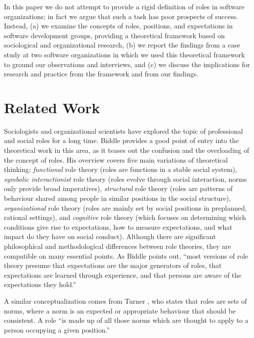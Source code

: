\documentclass[10pt, conference, compsocconf]{IEEEtran}
\begin{document}
In this paper we do not attempt to provide a rigid definition of roles in software organizations; in fact we argue that such a task has poor prospects of success. Instead, (a) we examine the concepts of roles, positions, and expectations in software development groups, providing a theoretical framework based on sociological and organizational research, (b) we report the findings from a case study at two software organizations in which we used this theoretical framework to ground our observations and interviews, and (c) we discuss the implications for research and practice from the framework and from our findings.




\section{Related Work}

Sociologists and organizational scientists have explored the topic of professional and social roles for a long time. Biddle \cite{Biddle1986} provides a good point of entry into the theoretical work in this area, as it teases out the confusion and the overloading of the concept of roles. His overview covers five main variations of theoretical thinking: \emph{functional} role theory (roles are functions in a stable social system), \emph{symbolic interactionist} role theory (roles evolve through social interaction, norms only provide broad imperatives), \emph{structural} role theory (roles are patterns of behaviour shared among people in similar positions in the social structure), \emph{organizational} role theory (roles are mainly set by social positions in preplanned, rational settings), and \emph{cognitive} role theory (which focuses on determining which conditions give rise to expectations, how to measure expectations, and what impact do they have on social conduct). Although there are significant philosophical and methodological differences between role theories, they are compatible on many essential points. As Biddle points out, ``most versions of role theory presume that expectations are the major generators of roles, that expectations are learned through experience, and that persons are aware of the expectations they hold.''

A similar conceptualization comes from Turner \cite{Turner1956}, who states that roles are sets of norms, where a norm is an expected or appropriate behaviour that should be consistent. A role ``is made up of all those norms which are thought to apply to a person occupying a given position.''
\end{document}
